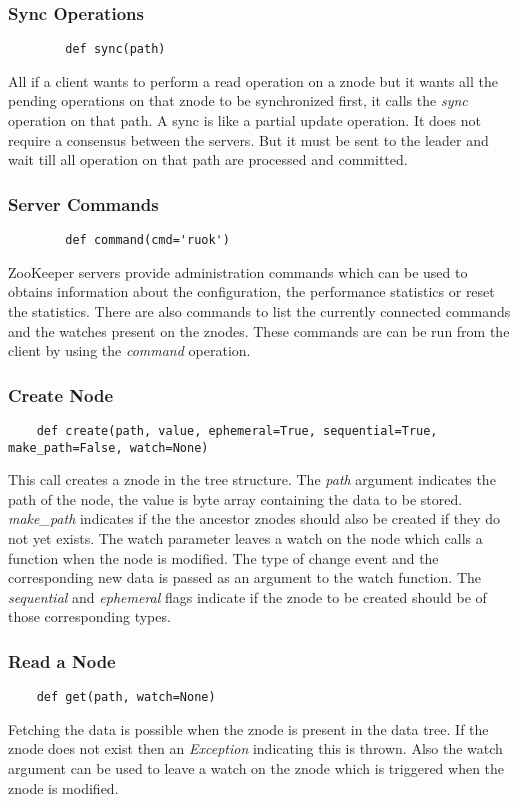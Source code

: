   \subsubsection{Sync Operations}
  	\begin{lstlisting}
  		def sync(path)
  	\end{lstlisting}
  	All if a client wants to perform a read operation on a znode but it wants all the pending operations on that znode to be synchronized first, it calls the \textit{sync} operation on that path. A sync is like a partial update operation. It does not require a consensus between the servers. But it must be sent to the leader and wait till all operation on that path are processed and committed. 

  \subsubsection{Server Commands}
  	\begin{lstlisting}
  		def command(cmd='ruok')
  	\end{lstlisting}
  	ZooKeeper servers provide administration commands which can be used to obtains information about the configuration, the performance statistics or reset the statistics. There are also commands to list the currently connected commands and the watches present on the znodes. These commands are can be run from the client by using the \textit{command} operation.

  \subsubsection{Create Node}
  \begin{lstlisting}
    def create(path, value, ephemeral=True, sequential=True, make_path=False, watch=None)
  \end{lstlisting}
  This call creates a znode in the tree structure. The \textit{path} argument indicates the path of the node, the value is byte array containing the data to be stored. \textit{make\_path} indicates if the the ancestor znodes should also be created if they do not yet exists. The watch parameter leaves a watch on the node which calls a function when the node is modified. The type of change event and the corresponding new data is passed as an argument to the watch function. The \textit{sequential} and \textit{ephemeral} flags indicate if the znode to be created should be of those corresponding types.
  
  \subsubsection{Read a Node}
  \begin{lstlisting}
    def get(path, watch=None)
  \end{lstlisting}
  Fetching the data is possible when the znode is present in the data tree. If the znode does not exist then an \textit{Exception} indicating this is thrown. Also the watch argument can be used to leave a watch on the znode which is triggered when the znode is modified.
  
